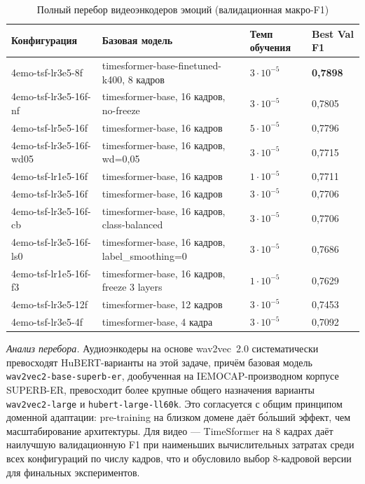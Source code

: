 \documentclass[a4paper, 12pt, oneside, openany]{article}
\begin{document}
\begin{table}[H]
\caption{Полный перебор видеоэнкодеров эмоций (валидационная макро-F1)}
\label{tab:full_video_sweep}
\centering
\small
\begin{tabular}{|p{6.5cm}|p{1.8cm}|p{1.8cm}|p{1.6cm}|}
\hline
\textbf{Конфигурация} & \textbf{Базовая модель} & \textbf{Темп обучения} & \textbf{Best Val F1} \\
\hline
4emo-tsf-lr3e5-8f & timesformer-base-finetuned-k400, 8 кадров & $3\!\cdot\!10^{-5}$ & \textbf{0,7898} \\
\hline
4emo-tsf-lr3e5-16f-nf & timesformer-base, 16 кадров, no-freeze & $3\!\cdot\!10^{-5}$ & 0,7805 \\
\hline
4emo-tsf-lr5e5-16f & timesformer-base, 16 кадров & $5\!\cdot\!10^{-5}$ & 0,7796 \\
\hline
4emo-tsf-lr3e5-16f-wd05 & timesformer-base, 16 кадров, wd=0,05 & $3\!\cdot\!10^{-5}$ & 0,7715 \\
\hline
4emo-tsf-lr1e5-16f & timesformer-base, 16 кадров & $1\!\cdot\!10^{-5}$ & 0,7711 \\
\hline
4emo-tsf-lr3e5-16f & timesformer-base, 16 кадров & $3\!\cdot\!10^{-5}$ & 0,7706 \\
\hline
4emo-tsf-lr3e5-16f-cb & timesformer-base, 16 кадров, class-balanced & $3\!\cdot\!10^{-5}$ & 0,7706 \\
\hline
4emo-tsf-lr3e5-16f-ls0 & timesformer-base, 16 кадров, label\_smoothing=0 & $3\!\cdot\!10^{-5}$ & 0,7686 \\
\hline
4emo-tsf-lr1e5-16f-f3 & timesformer-base, 16 кадров, freeze 3 layers & $1\!\cdot\!10^{-5}$ & 0,7629 \\
\hline
4emo-tsf-lr3e5-12f & timesformer-base, 12 кадров & $3\!\cdot\!10^{-5}$ & 0,7453 \\
\hline
4emo-tsf-lr3e5-4f & timesformer-base, 4 кадра & $3\!\cdot\!10^{-5}$ & 0,7092 \\
\hline
\end{tabular}
\end{table}

\textit{Анализ перебора.} Аудиоэнкодеры на основе wav2vec~2.0 систематически превосходят HuBERT-варианты на этой задаче, причём базовая модель \texttt{wav2vec2-base-superb-er}, дообученная на IEMOCAP-производном корпусе SUPERB-ER, превосходит более крупные общего назначения варианты \texttt{wav2vec2-large} и \texttt{hubert-large-ll60k}. Это согласуется с общим принципом доменной адаптации: pre-training на близком домене даёт б\'ольший эффект, чем масштабирование архитектуры. Для видео --- TimeSformer на 8 кадрах даёт наилучшую валидационную F1 при наименьших вычислительных затратах среди всех конфигураций по числу кадров, что и обусловило выбор 8-кадровой версии для финальных экспериментов.
\end{document}
